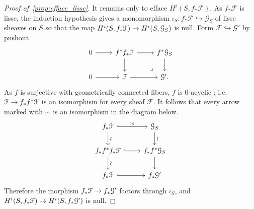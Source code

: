 \documentclass[deligne.tex]{subfiles}
\begin{document}
\begin{proof}[Proof of~\eqref{prop:efface_lisse}]
It remains only to efface $H^i(S,f_*\mathcal F)$. As $f_*\mathcal F$ is 
lisse, the induction hypothesis gives a monomorphism
$\iota_S:f_*\mathcal F\hookrightarrow\mathcal G_S$ of lisse sheaves on $S$
so that the map $H^i(S,f_*\mathcal F)\rightarrow H^i(S,\mathcal G_S)$ is null. Form
$\mathcal F\hookrightarrow\mathcal G'$ by pushout
\begin{equation*}\begin{tikzcd}
	0\arrow[r]&
	f^*f_*\mathcal F\arrow[r]\arrow[d]\arrow[dr,phantom,"\lrcorner",near end]
	&f^*\mathcal G_S\arrow[d] \\
	0\arrow[r]&\mathcal F\arrow[r]&\mathcal G'.
\end{tikzcd}\end{equation*}
As $f$ is surjective with geometrically connected fibers, $f$ is 0-acyclic 
\cite[XV 1.16]{SGAA}; i.e. $\mathcal F\rightarrow f_*f^*\mathcal F$ is an 
isomorphism for every sheaf $\mathcal F$. It follows that every arrow marked 
with $\sim$ is an isomorphism in the diagram below.
\begin{equation*}\begin{tikzcd}
	f_*\mathcal F\arrow[r,hookrightarrow,"\iota_S"]\arrow[d,"\rsim"]
	&\mathcal G_S\arrow[d,"\rsim"] \\
	f_*f^*f_*\mathcal F\arrow[r,hook]\arrow[d,"\rsim"]
	&f_*f^*\mathcal G_S\arrow[d] \\
	f_*\mathcal F\arrow[r,hook]&f_*\mathcal G'
\end{tikzcd}\end{equation*}
Therefore the morphism $f_*\mathcal F\rightarrow f_*\mathcal G'$ factors through
$\iota_S$, and $H^i(S,f_*\mathcal F)\rightarrow H^i(S,f_*\mathcal G')$ is null.
\end{proof}
\end{document}
